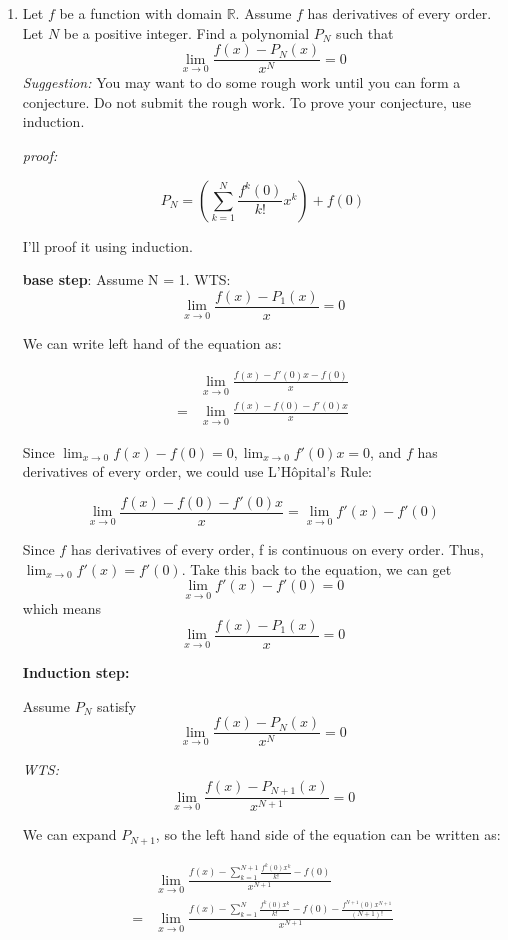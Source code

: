 \documentclass[12pt]{exam}
\newcommand {\DS} [1] {${\displaystyle #1}$}
\newcommand{\R}{\mathbb{R}}
\begin{document}
\begin{enumerate}
\begin{enumerate}

\newpage			

		\item  Let $f$ be a function with domain $\R$.  Assume $f$ has derivatives of every order.   Let $N$ be a positive integer.  Find a polynomial \DS{P_N} such that
			$$
				\lim_{x \to 0} \frac{f(x) - P_N(x)}{x^N} = 0
			$$
			\emph{Suggestion:} You may want to do some rough work until you can form a conjecture.    Do not submit the rough work.  To prove your conjecture, use induction.

			\emph{proof:}

			$$
			P_N = (\sum_{k = 1}^{N}\frac{f^k(0)}{k!}x^k) + f(0)
			$$

			I'll proof it using induction.

			\textbf{base step}: Assume N = 1.
			WTS:
			$$
				\lim_{x \to 0} \frac{f(x) - P_1(x)}{x} = 0
			$$

			We can write left hand of the equation as:

			\begin{align*}
				&\lim_{x \to 0} \frac{f(x) - f'(0)x - f(0)}{x} \\
				=& \lim_{x \to 0} \frac{f(x) - f(0) - f'(0)x}{x}
			\end{align*}

			Since $\lim_{x \to 0}{f(x) - f(0)} = 0, \lim_{x \to 0}{f'(0)x} = 0$, and  $f$ has derivatives of every order,
			we could use L'H\^{o}pital's Rule:

			$$
				\lim_{x \to 0} \frac{f(x) - f(0) - f'(0)x}{x}
				= \lim_{x \to 0} f'(x) - f'(0)
			$$

			Since $f$ has derivatives of every order, f is continuous on every order. 
			Thus, $\lim_{x \to 0} f'(x) = f'(0)$. 
			Take this back to the equation, we can get
			$$
				\lim_{x \to 0} f'(x) - f'(0) = 0
			$$
			which means 
			$$
				\lim_{x \to 0} \frac{f(x) - P_1(x)}{x} = 0
			$$

			\textbf{Induction step:}
			
			Assume $P_N$ satisfy $$\lim_{x \to 0} \frac{f(x) - P_N(x)}{x^N} = 0$$

			\emph{WTS:} $$\lim_{x \to 0} \frac{f(x) - P_{N+1}(x)}{x^{N+1}} = 0$$ 
			
			We can expand $P_{N+1}$, so the left hand side of the equation can be written as:

			\begin{align*}
				&\lim_{x \to 0} \frac{f(x) - \sum_{k = 1}^{N + 1} \frac{f^k(0)x^k}{k!} - f(0)}{x^{N + 1}} \\
				=& \lim_{x \to 0} \frac{f(x) - \sum_{k = 1}^{N} \frac{f^k(0)x^k}{k!} - f(0) - \frac{f^{N + 1}(0)x^{N + 1}}{(N + 1)!}}{x^{N + 1}} \\
			\end{align*}


\end{enumerate}
\end{enumerate}
\end{document}

